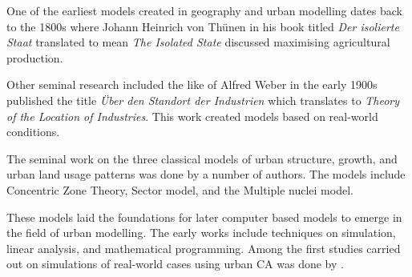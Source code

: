 One of the earliest models created in geography and urban modelling dates back to the 1800s where Johann Heinrich von Th{\"u}nen in his book titled \textsl{Der isolierte Staat} translated to mean \textsl{The Isolated State} discussed maximising agricultural production\citep{clark1967thunen}.

Other seminal research included the like of Alfred Weber in the early 1900s published the title \textsl{{\"U}ber den Standort der Industrien} which translates to \textsl{Theory of the Location of Industries}. This work created models based on real-world conditions\citep{fearon2006alfred}.

The seminal work on the three classical models of urban structure, growth, and urban land usage patterns was done by a number of authors. The models include Concentric Zone Theory, Sector model, and the Multiple nuclei model\citep{liu2008modelling}.

These models laid the foundations for later computer based models to emerge in the field of urban modelling. The early works include techniques on simulation, linear analysis, and mathematical programming\citep{kilbridge1970population}.
Among the first studies carried out on simulations of real-world cases using urban CA was done by \citep{batty}.

